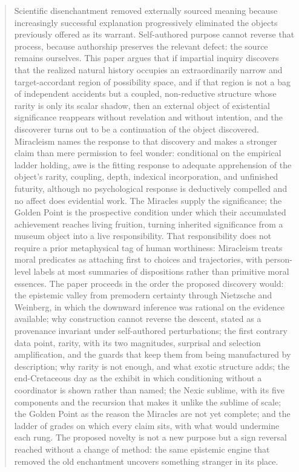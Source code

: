 \begin{abstract}
Scientific disenchantment removed externally sourced meaning because
increasingly successful explanation progressively eliminated the
objects previously offered as its warrant. Self-authored purpose cannot
reverse that process, because authorship preserves the relevant defect:
the source remains ourselves. This paper argues that if impartial
inquiry discovers that the realized natural history occupies an
extraordinarily narrow and target-accordant region of possibility space,
and if that region is not a bag of independent accidents but a coupled,
non-reductive structure whose rarity is only its scalar shadow, then an
external object of existential significance reappears without
revelation and without intention, and the discoverer turns out to be a
continuation of the object discovered. Miracleism names the response to
that discovery and makes a stronger claim than mere permission to feel
wonder: conditional on the empirical ladder holding, awe is the fitting
response to adequate apprehension of the object's rarity, coupling,
depth, indexical incorporation, and unfinished futurity, although no
psychological response is deductively compelled and no affect does
evidential work. The Miracles supply the significance; the Golden Point
is the prospective condition under which their accumulated achievement
reaches living fruition, turning inherited significance from a museum
object into a live responsibility. That responsibility does not require a
prior metaphysical tag of human worthiness: Miracleism treats moral
predicates as attaching first to choices and trajectories, with
person-level labels at most summaries of dispositions rather than
primitive moral essences. The paper proceeds in the order the proposed discovery would: the
epistemic valley from premodern certainty through Nietzsche and
Weinberg, in which the downward inference was rational on the evidence
available; why construction cannot reverse the descent, stated as a
provenance invariant under self-authored perturbations; the first
contrary data point, rarity, with its two magnitudes, surprisal and
selection amplification, and the guards that keep them from being
manufactured by description; why rarity is not enough, and what exotic
structure adds; the end-Cretaceous day as the exhibit in which
conditioning without a coordinator is shown rather than named; the
Nexic sublime, with its five components and the recursion that makes it
unlike the sublime of scale; the Golden Point as the reason the Miracles
are not yet complete; and the ladder of grades on which every claim
sits, with what would undermine each rung. The proposed novelty is not a new
purpose but a sign reversal reached without a change of method: the
same epistemic engine that removed the old enchantment uncovers
something stranger in its place.
\end{abstract}

